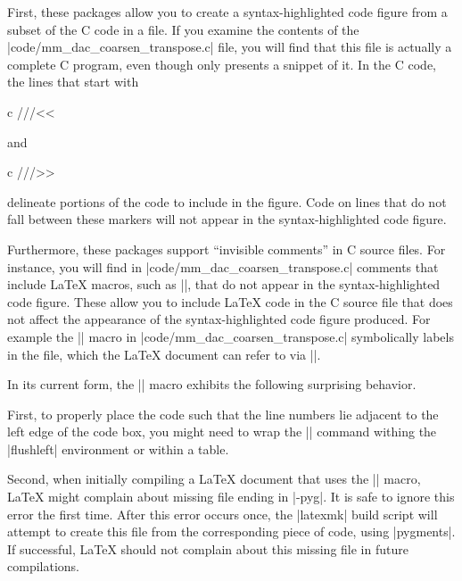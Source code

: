 \documentclass[10pt]{article}
\newcommand\latex[1]{\codevrb[latex]#1}
\begin{document}
First, these packages allow you to create a syntax-highlighted code
figure from a subset of the C code in a file.  If you examine the
contents of the \sh|code/mm_dac_coarsen_transpose.c| file, you will
find that this file is actually a complete C program, even though
 only presents a snippet of it.  In
the C code, the lines that start with
\begin{inparcode}
\begin{codehiliteOut}{c}
///<<
\end{codehiliteOut}
\end{inparcode}
and
\begin{inparcode}
\begin{codehiliteOut}{c}
///>>
\end{codehiliteOut}
\end{inparcode}
delineate portions of the code to include in the figure.  Code on
lines that do not fall between these markers will not appear in the
syntax-highlighted code figure.

Furthermore, these packages support ``invisible comments'' in C source
files.  For instance, you will find in
\sh|code/mm_dac_coarsen_transpose.c| comments that include \LaTeX{}
macros, such as \latex|\lilabel|, that do not appear in the
syntax-highlighted code figure.  These  allow
you to include \LaTeX{} code in the C source file that does not affect
the appearance of the syntax-highlighted code figure produced.  For
example the \latex|| macro in
\sh|code/mm_dac_coarsen_transpose.c| symbolically labels
 in the file, which the \LaTeX{} document can
refer to via \latex||.

In its current form, the \latex|\codefig| macro exhibits the following
surprising behavior.

First, to properly place the code such that the line numbers lie
adjacent to the left edge of the code box, you might need to wrap the
\latex|\codefig| command withing the \latex|flushleft| environment or
within a table.

Second, when initially compiling a \LaTeX{} document that uses the
\latex|\codefig| macro, \LaTeX{} might complain about missing file
ending in \sh|-pyg|.  It is safe to ignore this error the first time.
After this error occurs once, the \sh|latexmk| build script will
attempt to create this file from the corresponding piece of code,
using \sh|pygments|.  If successful, \LaTeX{} should not complain
about this missing file in future compilations.
\end{document}
